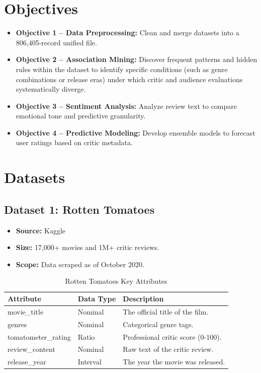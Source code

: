 \documentclass[conference]{IEEEtran}
\begin{document}
\section{Objectives}
\begin{itemize}
  \item \textbf{Objective 1 -- Data Preprocessing:} Clean and merge datasets into a 806,405-record unified file.
  \item \textbf{Objective 2 -- Association Mining:} Discover frequent patterns and hidden rules within the dataset to identify specific conditions (such as genre combinations or release eras) under which critic and audience evaluations systematically diverge.
  \item \textbf{Objective 3 -- Sentiment Analysis:} Analyze review text to compare emotional tone and predictive granularity.
  \item \textbf{Objective 4 -- Predictive Modeling:} Develop ensemble models to forecast user ratings based on critic metadata.
\end{itemize}

\section{Datasets}

\subsection{Dataset 1: Rotten Tomatoes}
\begin{itemize}
  \item \textbf{Source:} Kaggle \cite{leone2020rotten}
  \item \textbf{Size:} 17,000+ movies and 1M+ critic reviews.
  \item \textbf{Scope:} Data scraped as of October 2020.
\end{itemize}

\begin{table}[htbp]
  \caption{Rotten Tomatoes Key Attributes}
  \begin{center}
    \begin{tabularx}{\columnwidth}{|l|l|X|}
      \hline
      \textbf{Attribute}  & \textbf{Data Type} & \textbf{Description}               \\ \hline
      movie\_title        & Nominal            & The official title of the film.    \\ \hline
      genres              & Nominal            & Categorical genre tags.            \\ \hline
      tomatometer\_rating & Ratio              & Professional critic score (0-100). \\ \hline
      review\_content     & Nominal            & Raw text of the critic review.     \\ \hline
      release\_year       & Interval           & The year the movie was released.   \\ \hline
    \end{tabularx}
    \label{tab1}
  \end{center}
\end{table}
\end{document}
